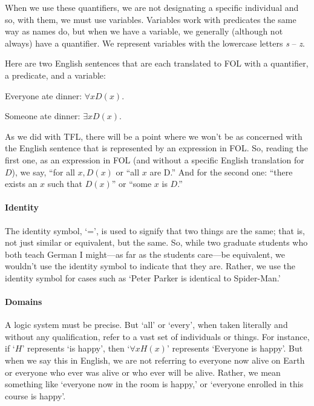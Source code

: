 When we use these quantifiers, we are not designating a specific individual and so, with them, we must use variables. Variables work with predicates the same way as names do, but when we have a variable, we generally (although not always) have a quantifier. We represent variables with the lowercase letters \textit{s} -- \textit{z}.

Here are two English sentences that are each translated to FOL with a quantifier, a predicate, and a variable:

\begin{ebullet}
	\item[] Everyone ate dinner: $\forall x D(x)$. 
	\item[] Someone ate dinner: $\exists x D(x)$.
\end{ebullet}

As we did with TFL, there will be a point where we won’t be as concerned with the English sentence that is represented by an expression in FOL. So, reading the first one, as an expression in FOL (and without a specific English translation for $D$), we say, ``for all $x, D(x)$ or ``all $x$ are D.'' And for the second one: ``there exists an $x$ such that $D(x)$” or ``some $x$ is $D$.'' 


\paragraph{Identity}

The identity symbol, `=’, is used to signify that two things are the same; that is, not just similar or equivalent, but the same. So, while two graduate students who both teach German I might---as far as the students care---be equivalent, we wouldn't use the identity symbol to indicate that they are. Rather, we use the identity symbol for cases such as `Peter Parker is identical to Spider-Man.’ 


\paragraph{Domains}

A logic system must be precise. But `all’ or `every’, when taken literally and without any qualification, refer to a vast set of individuals or things. For instance, if `$H$' represents `is happy’, then ‘$\forall x H(x)$’ represents ‘Everyone is happy’. But when we say this in English, we are not referring to everyone now alive on Earth or everyone who ever was alive or who ever will be alive. Rather, we mean something like `everyone now in the room is happy,’ or `everyone enrolled in this course is happy’.
 
